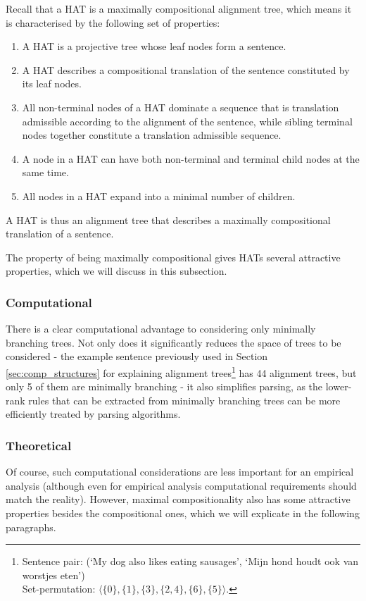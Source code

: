 Recall that a HAT is a maximally compositional alignment tree, which means it is characterised by the following set of properties:\begin{enumerate}
\item A HAT is a projective tree whose leaf nodes form a sentence.
\item A HAT describes a compositional translation of the sentence constituted by its leaf nodes.
\item All non-terminal nodes of a HAT dominate a sequence that is translation admissible according to the alignment of the sentence, while sibling terminal nodes together constitute a translation admissible sequence.
\item A node in a HAT can have both non-terminal and terminal child nodes at the same time.
\item All nodes in a HAT expand into a minimal number of children.
\end{enumerate}

\noindent A HAT is thus an alignment tree that describes a maximally compositional translation of a sentence. 

The property of being maximally compositional gives HATs several attractive properties, which we will discuss in this subsection.

\subsubsection{Computational}
There is a clear computational advantage to considering only minimally branching trees. Not only does it significantly reduces the space of trees to be considered - the example sentence previously used in Section \ref{sec:comp_structures} for explaining alignment trees\footnote{Sentence pair: (`My dog also likes eating sausages', `Mijn hond houdt ook van worstjes eten')\\Set-permutation: $\langle \{0\}, \{1\}, \{3\}, \{2,4\}, \{6\}, \{5\}\rangle$. } has 44 alignment trees, but only 5 of them are minimally branching - it also simplifies parsing, as the lower-rank rules that can be extracted from minimally branching trees can be more efficiently treated by parsing algorithms.

\subsubsection{Theoretical}

Of course, such computational considerations are less important for an empirical analysis (although even for empirical analysis computational requirements should match the reality). However, maximal compositionality also has some attractive properties besides the compositional ones, which we will explicate in the following paragraphs.

